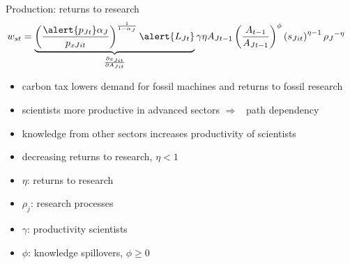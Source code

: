 \documentclass[11pt,aspectratio=169]{beamer}
\newcommand{\ar}{$\Rightarrow$ \ }
\begin{document}
\begin{frame}{Production: returns to research}
	\vspace{-2mm}
	\begin{align*}
	w_{st}&=\underbrace{\left(\frac{\alert{p_{Jt}}\alpha_J}{p_{xJit}}\right)^{\frac{1}{1-\alpha_J}}\alert{L_{Jt}}}_{\frac{\partial x_{Jit}}{\partial A_{Jit}}}\gamma \eta A_{Jt-1} \left(\frac{A_{t-1}}{A_{Jt-1}}\right)^{\phi}\left({s_{Jit}}\right)^{\eta-1}{\rho_J}^{-\eta}
\end{align*}
	\begin{itemize}
		\item \alert{carbon tax lowers demand for fossil machines and returns to fossil research}
		\item scientists more productive in advanced sectors \ar path dependency
		\item knowledge from other sectors increases productivity of scientists
		\item decreasing returns to research, $\eta<1$
	\end{itemize}
	\small
	\vspace{7mm}
	\hspace{-4mm}
	\begin{minipage}[t!]{0.3\textwidth}
		\vspace{0mm}
		\begin{itemize}
			\item[] $\eta$: returns to research  \vspace{-2mm}
			\item[] $\rho_j$: research processes
		\end{itemize}
	\end{minipage}
\vspace{-5mm}
	\begin{minipage}[t!]{0.5\textwidth}
	\vspace{0mm}
	\begin{itemize}	
		\item[] $\gamma$: productivity scientists
		\vspace{-2mm}	
		\item[] $\phi$: knowledge spillovers, $\phi\geq0$
	\end{itemize}
\end{minipage}
\end{frame}
\end{document}
